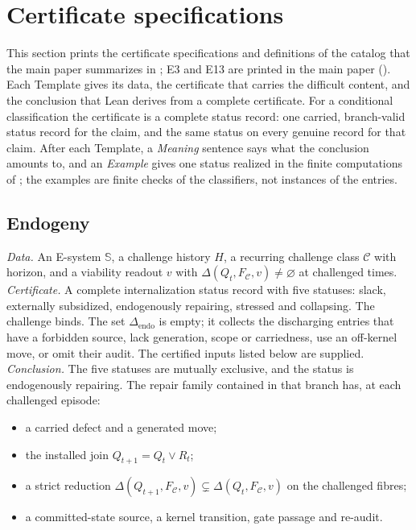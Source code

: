 \section{Certificate specifications}
\label{supp:templates}

This section prints the certificate specifications and definitions of the catalog that the main
paper summarizes in ; E3 and E13 are printed in the main paper
(). Each Template gives its data, the certificate that carries the difficult
content, and the conclusion that Lean derives from a complete certificate. For a conditional
classification the certificate is a complete status record: one carried, branch-valid status record
for the claim, and the same status on every genuine record for that claim. After each Template, a
\emph{Meaning} sentence says what the conclusion amounts to, and an \emph{Example} gives one status
realized in the finite computations of ; the examples are finite checks of the
classifiers, not instances of the entries.

\subsection{Endogeny}\label{sec:tmpl-endogeny}

\begin{schema}[E1: internalization]\label{tmpl:e1}
\emph{Data.} An E-system $\mathbb S$, a challenge history $H$, a recurring challenge class
$\mathcal C$ with horizon, and a viability readout $v$ with $\Delta(Q_t, F_{\mathcal C}, v) \ne
\varnothing$ at challenged times.
\emph{Certificate.} A complete internalization status record with five statuses: slack, externally
subsidized, endogenously repairing, stressed and collapsing. The challenge binds. The set
$\Delta_{\mathrm{endo}}$ is empty; it collects the discharging entries that have a forbidden source,
lack generation, scope or carriedness, use an off-kernel move, or omit their audit. The certified
inputs listed below are supplied.
\emph{Conclusion.} The five statuses are mutually exclusive, and the status is endogenously
repairing. The repair family contained in that branch has, at each challenged episode:
\begin{itemize}
  \item a carried defect and a generated move;
  \item the installed join $Q_{t+1} = Q_t \vee R_t$;
  \item a strict reduction
    $\Delta(Q_{t+1}, F_{\mathcal C}, v) \subsetneq \Delta(Q_t, F_{\mathcal C}, v)$ on the challenged
    fibres;
  \item a committed-state source, a kernel transition, gate passage and re-audit.
\end{itemize}
\end{schema}


